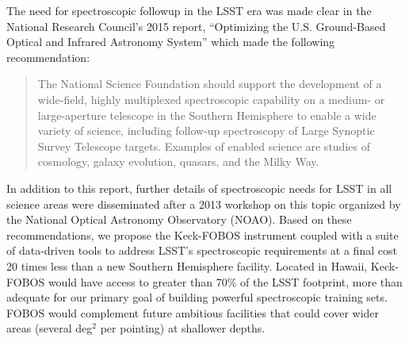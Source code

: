 \documentclass[oneside,11pt]{amsart}
\begin{document}

The need for spectroscopic followup in the LSST era was made clear in the National Research Council's 2015 report, ``Optimizing the U.S. Ground-Based Optical and Infrared Astronomy System'' \citep{NAP21722} which made the following recommendation:

\begin{quote}
The National Science Foundation should support the development of a wide-field, highly multiplexed spectroscopic capability on a medium- or large-aperture telescope in the Southern Hemisphere to enable a wide variety of science, including follow-up spectroscopy of Large Synoptic Survey Telescope targets. Examples of enabled science are studies of cosmology, galaxy evolution, quasars, and the Milky Way.
\end{quote}



In addition to this report, further details of spectroscopic needs for LSST in all science areas were disseminated
after a 2013 workshop on this topic organized by the National Optical
Astronomy Observatory (NOAO).  Based on these recommendations, we propose the Keck-FOBOS instrument coupled
with a suite of data-driven tools to address LSST's spectroscopic requirements at a final cost 20 times less than
a new Southern Hemisphere facility. Located in Hawaii, Keck-FOBOS would have access to greater than 70\% of the LSST
footprint, more than adequate for our primary goal of building powerful spectroscopic training sets.  FOBOS would complement future ambitious facilities that could cover wider areas (several deg$^2$ per pointing) at shallower depths.
\end{document}
